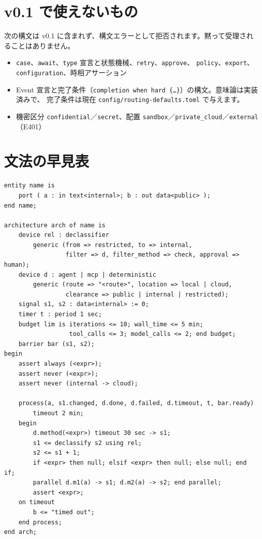 \documentclass[a4paper,11pt]{ltjsarticle}
\begin{document}
\section{v0.1 で使えないもの}

次の構文は v0.1 に含まれず、構文エラーとして拒否されます。黙って受理されることはありません。
\begin{itemize}
  \item \texttt{case}、\texttt{await}、\texttt{type} 宣言と状態機械、\texttt{retry}、\texttt{approve}、
        \texttt{policy}、\texttt{export}、\texttt{configuration}、時相アサーション
  \item Event 宣言と完了条件（\texttt{completion when hard \{\dots\}}）の構文。意味論は実装済みで、
        完了条件は現在 \texttt{config/routing-defaults.toml} で与えます。
  \item 機密区分 \texttt{confidential}／\texttt{secret}、配置 \texttt{sandbox}／\texttt{private\_cloud}／\texttt{external}（E401）
\end{itemize}

\appendix
\section{文法の早見表}

\begin{lstlisting}[language=AWHDL]
entity name is
    port ( a : in text<internal>; b : out data<public> );
end name;

architecture arch of name is
    device rel : declassifier
        generic (from => restricted, to => internal,
                 filter => d, filter_method => check, approval => human);
    device d : agent | mcp | deterministic
        generic (route => "<route>", location => local | cloud,
                 clearance => public | internal | restricted);
    signal s1, s2 : data<internal> := 0;
    timer t : period 1 sec;
    budget lim is iterations <= 10; wall_time <= 5 min;
                  tool_calls <= 3; model_calls <= 2; end budget;
    barrier bar (s1, s2);
begin
    assert always (<expr>);
    assert never (<expr>);
    assert never (internal -> cloud);

    process(a, s1.changed, d.done, d.failed, d.timeout, t, bar.ready)
        timeout 2 min;
    begin
        d.method(<expr>) timeout 30 sec -> s1;
        s1 <= declassify s2 using rel;
        s2 <= s1 + 1;
        if <expr> then null; elsif <expr> then null; else null; end if;
        parallel d.m1(a) -> s1; d.m2(a) -> s2; end parallel;
        assert <expr>;
    on timeout
        b <= "timed out";
    end process;
end arch;
\end{lstlisting}
\end{document}
